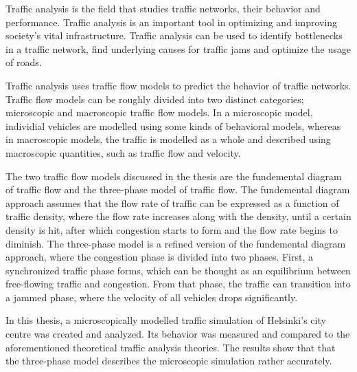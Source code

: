 \documentclass[english, 12pt, a4paper, elec, utf8, pdfa, online]{aaltothesis}
\date{\pubdate}
\begin{document}
\makecoverpage
\makecopyrightpage

\begin{abstractpage}[english]
Traffic analysis is the field that studies traffic networks, their behavior and performance. Traffic analysis is an important tool in optimizing and improving society's vital infrastructure. Traffic analysis can be used to identify bottlenecks in a traffic network, find underlying causes for traffic jams and optimize the usage of roads.

Traffic analysis uses traffic flow models to predict the behavior of traffic networks. Traffic flow models can be roughly divided into two distinct categories; microscopic and macroscopic traffic flow models. In a microscopic model, individial vehicles are modelled using some kinds of behavioral models, whereas in macroscopic models, the traffic is modelled as a whole and described using macroscopic quantities, such as traffic flow and velocity.

The two traffic flow models discussed in the thesis are the fundemental diagram of traffic flow and the three-phase model of traffic flow. The fundemental diagram approach assumes that the flow rate of traffic can be expressed as a function of traffic density, where the flow rate increases along with the density, until a certain density is hit, after which congestion starts to form and the flow rate begins to diminish. The three-phase model is a refined version of the fundemental diagram approach, where the congestion phase is divided into two phases. First, a synchronized traffic phase forms, which can be thought as an equilibrium between free-flowing traffic and congestion. From that phase, the traffic can transition into a jammed phase, where the velocity of all vehicles drops significantly.

In this thesis, a microscopically modelled traffic simulation of Helsinki's city centre was created and analyzed. Its behavior was measured and compared to the aforementioned theoretical traffic analysis theories. The results show that that the three-phase model describes the microscopic simulation rather accurately.
\end{abstractpage}

\newpage

\end{document}
